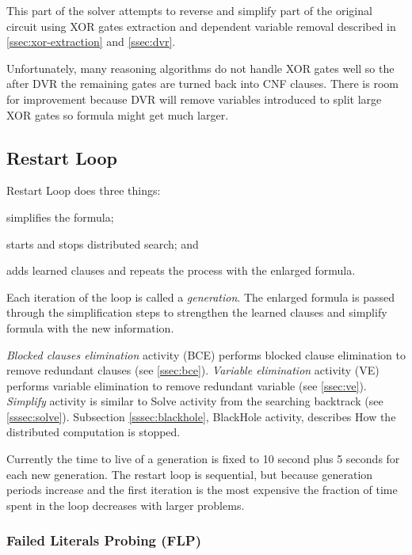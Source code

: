 This part of the solver attempts to reverse and simplify part of the
original circuit using XOR gates extraction and dependent variable
removal described in \ref{ssec:xor-extraction} and \ref{ssec:dvr}.

Unfortunately, many reasoning algorithms do not handle XOR gates
well so the after DVR the remaining gates are turned back into CNF
clauses. There is room for improvement because DVR will remove
variables introduced to split large XOR gates so formula might get
much larger.


\subsection{Restart Loop}

Restart Loop does three things:
\begin{inparaenum}[a)]
  \item simplifies the formula;
  \item starts and stops distributed search; and
  \item adds learned clauses and repeats the process with the enlarged formula.
\end{inparaenum} Each iteration of the loop is called a
\emph{generation}. The enlarged formula is passed through the
simplification steps to strengthen the learned clauses and simplify
formula with the new information.

\emph{Blocked clauses elimination} activity (BCE) performs
blocked clause elimination to remove redundant clauses (see
\ref{ssec:bce}). \emph{Variable elimination} activity (VE) performs
variable elimination to remove redundant variable (see
\ref{ssec:ve}). \emph{Simplify} activity is similar to Solve
activity from the searching backtrack (see \ref{sssec:solve}).
Subsection \ref{sssec:blackhole}, BlackHole activity, describes
How the distributed computation is stopped.

Currently the time to live of a generation is fixed to 10 second
plus 5 seconds for each new generation.  The restart loop is sequential, but because generation
periods increase and the first iteration is the most expensive the
fraction of time spent in the loop decreases with larger problems.


\subsubsection{Failed Literals Probing (FLP)}
\label{sssec:flp}

